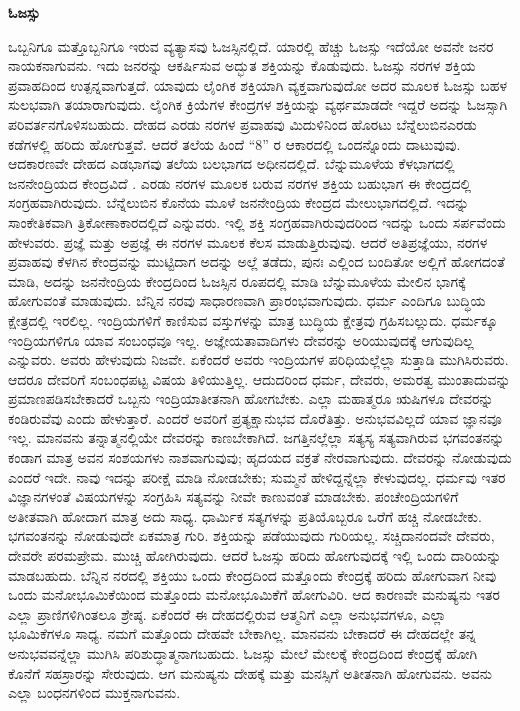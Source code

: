 \vskip -0.5cm

\begin{center}
\textbf{ಓಜಸ್ಸು}
\end{center}

\vskip -0.4cm

ಒಬ್ಬನಿಗೂ ಮತ್ತೊಬ್ಬನಿಗೂ ಇರುವ ವ್ಯತ್ಯಾಸವು ಓಜಸ್ಸಿನಲ್ಲಿದೆ. ಯಾರಲ್ಲಿ ಹೆಚ್ಚು ಓಜಸ್ಸು ಇದೆಯೋ ಅವನೇ ಜನರ ನಾಯಕನಾಗುವನು. ಇದು ಜನರನ್ನು ಆಕರ್ಷಿಸುವ ಅದ್ಭುತ ಶಕ್ತಿಯನ್ನು ಕೊಡುವುದು. ಓಜಸ್ಸು ನರಗಳ ಶಕ್ತಿಯ ಪ್ರವಾಹದಿಂದ  ಉತ್ಪನ್ನವಾಗುತ್ತದೆ. ಯಾವುದು ಲೈಂಗಿಕ ಶಕ್ತಿಯಾಗಿ ವ್ಯಕ್ತವಾಗುವುದೋ ಅದರ ಮೂಲಕ ಓಜಸ್ಸು ಬಹಳ ಸುಲಭವಾಗಿ ತಯಾರಾಗುವುದು. ಲೈಂಗಿಕ ಕ್ರಿಯೆಗಳ ಕೇಂದ್ರಗಳ ಶಕ್ತಿಯನ್ನು ವ್ಯರ್ಥಮಾಡದೇ ಇದ್ದರೆ ಅದನ್ನು ಓಜಸ್ಸಾಗಿ ಪರಿವರ್ತನಗೊಳಿಸಬಹುದು. ದೇಹದ ಎರಡು ನರಗಳ ಪ್ರವಾಹವು ಮಿದುಳಿನಿಂದ ಹೊರಟು ಬೆನ್ನೆಲುಬಿನ\break ಎರಡು ಕಡೆಗಳಲ್ಲಿ ಹರಿದು ಹೋಗುತ್ತವೆ. ಆದರೆ ತಲೆಯ ಹಿಂದೆ “8” ರ ಆಕಾರದಲ್ಲಿ ಒಂದನ್ನೊಂದು ದಾಟುವುವು. ಆದಕಾರಣವೇ ದೇಹದ ಎಡಭಾಗವು ತಲೆಯ ಬಲಭಾಗದ ಅಧೀನದಲ್ಲಿದೆ. ಬೆನ್ನುಮೂಳೆಯ ಕೆಳಭಾಗದಲ್ಲಿ ಜನನೇಂದ್ರಿಯದ ಕೇಂದ್ರವಿದೆ . ಎರಡು ನರಗಳ ಮೂಲಕ ಬರುವ ನರಗಳ ಶಕ್ತಿಯ ಬಹುಭಾಗ ಈ ಕೇಂದ್ರದಲ್ಲಿ ಸಂಗ್ರಹವಾಗಿರುವುದು. ಬೆನ್ನೆಲುಬಿನ ಕೊನೆಯ ಮೂಳೆ ಜನನೇಂದ್ರಿಯ ಕೇಂದ್ರದ ಮೇಲುಭಾಗದಲ್ಲಿದೆ. ಇದನ್ನು ಸಾಂಕೇತಿಕವಾಗಿ ತ್ರಿಕೋಣಾಕಾರದಲ್ಲಿದೆ ಎನ್ನುವರು. ಇಲ್ಲಿ ಶಕ್ತಿ ಸಂಗ್ರಹವಾಗಿರುವುದರಿಂದ ಇದನ್ನು ಒಂದು ಸರ್ಪವೆಂದು ಹೇಳುವರು. ಪ್ರಜ್ಞೆ ಮತ್ತು ಅಪ್ರಜ್ಞೆ ಈ ನರಗಳ ಮೂಲಕ ಕೆಲಸ ಮಾಡುತ್ತಿರುವುವು. ಆದರೆ ಅತಿಪ್ರಜ್ಞೆಯು, ನರಗಳ ಪ್ರವಾಹವು ಕೆಳಗಿನ ಕೇಂದ್ರವನ್ನು ಮುಟ್ಟಿದಾಗ ಅದನ್ನು ಅಲ್ಲೆ ತಡೆದು, ಪುನಃ ಎಲ್ಲಿಂದ ಬಂದಿತೋ ಅಲ್ಲಿಗೆ ಹೋಗದಂತೆ ಮಾಡಿ, ಅದನ್ನು ಜನನೇಂದ್ರಿಯ ಕೇಂದ್ರದಿಂದ ಓಜಸ್ಸಿನ ರೂಪದಲ್ಲಿ ಮಾಡಿ ಬೆನ್ನುಮೂಳೆಯ ಮೇಲಿನ ಭಾಗಕ್ಕೆ ಹೋಗುವಂತೆ ಮಾಡುವುದು. ಬೆನ್ನಿನ ನರವು ಸಾಧಾರಣವಾಗಿ ಪ್ರಾರಂಭವಾಗುವುದು. ಧರ್ಮ ಎಂದಿಗೂ ಬುದ್ಧಿಯ ಕ್ಷೇತ್ರದಲ್ಲಿ ಇರಲಿಲ್ಲ. ಇಂದ್ರಿಯಗಳಿಗೆ ಕಾಣಿಸುವ ವಸ್ತುಗಳನ್ನು ಮಾತ್ರ ಬುದ್ಧಿಯ ಕ್ಷೇತ್ರವು ಗ್ರಹಿಸಬಲ್ಲುದು. ಧರ್ಮಕ್ಕೂ ಇಂದ್ರಿಯಗಳಿಗೂ ಯಾವ ಸಂಬಂಧವೂ ಇಲ್ಲ. ಅಜ್ಞೇಯತಾವಾದಿಗಳು ದೇವರನ್ನು ಅರಿಯುವುದಕ್ಕೆ ಆಗುವುದಿಲ್ಲ ಎನ್ನುವರು. ಅವರು ಹೇಳುವುದು ನಿಜವೇ. ಏಕೆಂದರೆ ಅವರು ಇಂದ್ರಿಯಗಳ ಪರಿಧಿಯಲ್ಲೆಲ್ಲಾ ಸುತ್ತಾಡಿ ಮುಗಿಸಿರುವರು. ಆದರೂ ದೇವರಿಗೆ ಸಂಬಂಧಪಟ್ಟ ವಿಷಯ ತಿಳಿಯುತ್ತಿಲ್ಲ. ಆದುದರಿಂದ ಧರ್ಮ, ದೇವರು, ಅಮರತ್ವ ಮುಂತಾದುವನ್ನು ಪ್ರಮಾಣಪಡಿಸಬೇಕಾದರೆ ಒಬ್ಬನು ಇಂದ್ರಿಯಾತೀತನಾಗಿ ಹೋಗಬೇಕು. ಎಲ್ಲಾ ಮಹಾತ್ಮರೂ ಋಷಿಗಳೂ ದೇವರನ್ನು ಕಂಡಿರುವೆವು ಎಂದು ಹೇಳುತ್ತಾರೆ. ಎಂದರೆ ಅವರಿಗೆ ಪ್ರತ್ಯಕ್ಷಾನುಭವ ದೊರೆತಿತ್ತು. ಅನುಭವವಿಲ್ಲದೆ ಯಾವ ಜ್ಞಾನವೂ ಇಲ್ಲ. ಮಾನವನು ತನ್ನಾತ್ಮನಲ್ಲಿಯೇ ದೇವರನ್ನು ಕಾಣಬೇಕಾಗಿದೆ. ಜಗತ್ತಿನಲ್ಲೆಲ್ಲಾ ಸತ್ಯಸ್ಯ ಸತ್ಯವಾಗಿರುವ ಭಗವಂತನನ್ನು ಕಂಡಾಗ ಮಾತ್ರ ಅವನ ಸಂಶಯಗಳು ನಾಶವಾಗುವುವು; ಹೃದಯದ ವಕ್ರತೆ ನೇರವಾಗುವುದು. ದೇವರನ್ನು ನೋಡುವುದು ಎಂದರೆ ಇದೇ. ನಾವು ಇದನ್ನು ಪರೀಕ್ಷೆ ಮಾಡಿ ನೋಡಬೇಕು; ಸುಮ್ಮನೆ ಹೇಳಿದ್ದನ್ನೆಲ್ಲಾ ಕೇಳುವುದಲ್ಲ. ಧರ್ಮವು ಇತರ ವಿಜ್ಞಾನಗಳಂತೆ ವಿಷಯಗಳನ್ನು ಸಂಗ್ರಹಿಸಿ ಸತ್ಯವನ್ನು ನೀವೇ ಕಾಣುವಂತೆ ಮಾಡಬೇಕು. ಪಂಚೇಂದ್ರಿಯಗಳಿಗೆ ಅತೀತವಾಗಿ ಹೋದಾಗ ಮಾತ್ರ ಅದು ಸಾಧ್ಯ. ಧಾರ್ಮಿಕ ಸತ್ಯಗಳನ್ನು ಪ್ರತಿಯೊಬ್ಬರೂ ಒರೆಗೆ ಹಚ್ಚಿ ನೋಡಬೇಕು. ಭಗವಂತನನ್ನು ನೋಡುವುದೇ ಏಕಮಾತ್ರ ಗುರಿ. ಶಕ್ತಿಯನ್ನು ಪಡೆಯುವುದು ಗುರಿಯಲ್ಲ. ಸಚ್ಚಿದಾನಂದವೇ ದೇವರು, ದೇವರೇ ಪರಮಪ್ರೇಮ. ಮುಚ್ಚಿ ಹೋಗಿರುವುದು. ಆದರೆ ಓಜಸ್ಸು ಹರಿದು ಹೋಗುವುದಕ್ಕೆ ಇಲ್ಲಿ ಒಂದು ದಾರಿಯನ್ನು ಮಾಡಬಹುದು. ಬೆನ್ನಿನ ನರದಲ್ಲಿ ಶಕ್ತಿಯು ಒಂದು ಕೇಂದ್ರದಿಂದ ಮತ್ತೊಂದು ಕೇಂದ್ರಕ್ಕೆ ಹರಿದು ಹೋಗುವಾಗ ನೀವು ಒಂದು ಮನೋಭೂಮಿಕೆಯಿಂದ ಮತ್ತೊಂದು ಮನೋಭೂಮಿಕೆಗೆ ಹೋಗುವಿರಿ. ಆದ ಕಾರಣವೇ ಮನುಷ್ಯನು ಇತರ ಎಲ್ಲಾ ಪ್ರಾಣಿಗಳಿಗಿಂತಲೂ ಶ್ರೇಷ್ಠ. ಏಕೆಂದರೆ ಈ ದೇಹದಲ್ಲಿರುವ ಆತ್ಮನಿಗೆ ಎಲ್ಲಾ ಅನುಭವಗಳೂ, ಎಲ್ಲಾ ಭೂಮಿಕೆಗಳೂ ಸಾಧ್ಯ. ನಮಗೆ ಮತ್ತೊಂದು ದೇಹವೇ ಬೇಕಾಗಿಲ್ಲ. ಮಾನವನು ಬೇಕಾದರೆ ಈ ದೇಹದಲ್ಲೇ ತನ್ನ ಅನುಭವವನ್ನೆಲ್ಲಾ ಮುಗಿಸಿ ಪರಿಶುದ್ಧಾತ್ಮನಾಗಬಹುದು. ಓಜಸ್ಸು ಮೇಲೆ ಮೇಲಕ್ಕೆ ಕೇಂದ್ರದಿಂದ ಕೇಂದ್ರಕ್ಕೆ ಹೋಗಿ ಕೊನೆಗೆ ಸಹಸ್ರಾರನ್ನು ಸೇರುವುದು. ಆಗ ಮನುಷ್ಯನು ದೇಹಕ್ಕೆ ಮತ್ತು ಮನಸ್ಸಿಗೆ ಅತೀತನಾಗಿ ಹೋಗುವನು. ಅವನು ಎಲ್ಲಾ ಬಂಧನಗಳಿಂದ ಮುಕ್ತನಾಗುವನು.

